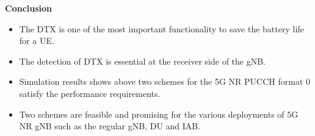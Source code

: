\documentclass{beamer}
\begin{document}
\begin{frame}{\textbf{Conclusion}}
\begin{itemize}
 \item The DTX is one of the most important functionality to save the battery life for a UE.
 \item The detection of DTX is essential at the receiver side of the gNB.
 \item Simulation results shows above two schemes for the 5G NR PUCCH format 0 satisfy the performance requirements.
 \item Two schemes are feasible and promising for the various deployments of 5G NR gNB such as the regular gNB, DU and IAB.
\end{itemize}
\end{frame}
\end{document}
